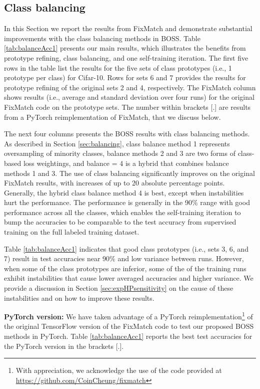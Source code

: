 \documentclass[final]{cvpr}
\newcommand{\FM}{FixMatch }
\begin{document}
\subsection{Class balancing}
\label{sec:expBalancing}



In this Section we report the results from FixMatch and demonstrate substantial improvements with the class balancing methods in BOSS.
Table \ref{tab:balanceAcc1} presents our main results, which illustrates the benefits from prototype refining, class balancing, and one self-training iteration.
The first five rows in the table list the results for the five sets of class prototypes (i.e., 1 prototype per class) for Cifar-10.
Rows for sets 6 and 7 provides the results for prototype refining of the original sets 2 and 4, respectively.  
The FixMatch column shows results (i.e., average and standard deviation over four runs) for the original FixMatch code on the prototype sets. 
The number within brackets [.] are results from a PyTorch reimplementation of FixMatch, that we discuss below.

The next four columns presents the BOSS results with class balancing methods.
As described in Section \ref{sec:balancing}, class balance method 1 represents oversampling of minority classes, balance methods 2 and 3 are two forms of class-based loss weightings, and balance = 4 is a  hybrid that combines balance methods 1 and 3.
The use of class balancing significantly improves on the original FixMatch results, with increases of up to 20 absolute percentage points.
Generally, the hybrid class balance method 4 is best, except when instabilities hurt the performance.
The performance is generally in the 90\% range with good performance across all the classes, which enables the self-training iteration to bump the accuracies to be comparable to the test accuracy from supervised training on the full labeled training dataset.

Table \ref{tab:balanceAcc1} indicates that good class prototypes (i.e., sets 3, 6, and 7) result in test accuracies near 90\% and low variance between runs.
However, when some of the class prototypes are inferior, some of the of the training runs exhibit instabilities that cause lower averaged accuracies and higher variance.
We provide a discussion in Section \ref{sec:expHPsensitivity} on the cause of these instabilities and on how to improve these results.


\textbf{PyTorch version:}
We have taken advantage of a PyTorch reimplementation\footnote{With appreciation, we acknowledge the use of the code provided at \url{https://github.com/CoinCheung/fixmatch} } of the original TensorFlow version of the \FM code to test our proposed BOSS methods in PyTorch.
Table \ref{tab:balanceAcc1} reports the best test accuracies for the PyTorch version in the brackets [.].
\end{document}
